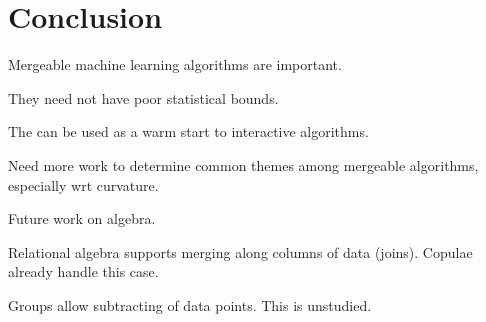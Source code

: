 \documentclass[thesis.tex]{subfiles}
\begin{document}
\chapter{Conclusion}
\label{chapter:conclusion}

Mergeable machine learning algorithms are important.

They need not have poor statistical bounds.

The can be used as a warm start to interactive algorithms.

Need more work to determine common themes among mergeable algorithms, especially wrt curvature.

Future work on algebra.

Relational algebra supports merging along columns of data (joins).
Copulae already handle this case.

Groups allow subtracting of data points.
This is unstudied.

%
\end{document}
